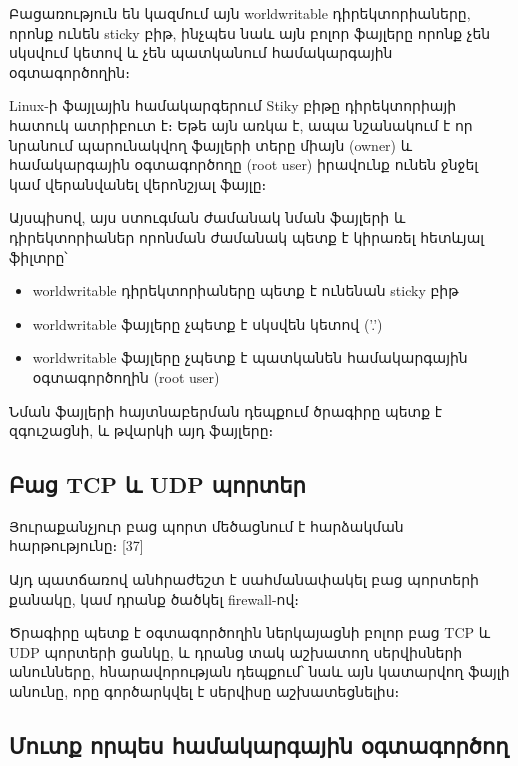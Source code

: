 \documentclass[12pt]{article}
\begin{document}
\begin{sloppypar}
Բացառություն են կազմում այն worldwritable դիրեկտորիաները, որոնք ունեն
sticky բիթ, ինչպես նաև այն բոլոր ֆայլերը որոնք չեն սկսվում կետով և չեն
պատկանում համակարգային օգտագործողին։

Linux-ի ֆայլային համակարգերում Stiky բիթը դիրեկտորիայի հատուկ ատրիբուտ է։
Եթե այն առկա է, ապա նշանակում է որ նրանում պարունակվող ֆայլերի տերը միայն (owner)
և համակարգային օգտագործողը (root user) իրավունք ունեն ջնջել կամ վերանվանել
վերոնշյալ ֆայլը։

Այսպիսով, այս ստուգման ժամանակ նման ֆայլերի և դիրեկտորիաներ որոնման ժամանակ
պետք է կիրառել հետևյալ ֆիլտրը՝

\begin{itemize}
\item worldwritable դիրեկտորիաները պետք է ունենան sticky բիթ
\item worldwritable ֆայլերը չպետք է սկսվեն կետով ('.')
\item worldwritable ֆայլերը չպետք է պատկանեն համակարգային օգտագործողին
	(root user)
\end{itemize}

Նման ֆայլերի հայտնաբերման դեպքում ծրագիրը պետք է զգուշացնի,
և թվարկի այդ ֆայլերը։


\subsection{Բաց TCP և UDP պորտեր}


Յուրաքանչյուր բաց պորտ մեծացնում է հարձակման հարթությունը։ [37]

Այդ պատճառով անհրաժեշտ է սահմանափակել բաց պորտերի քանակը,
կամ դրանք ծածկել firewall-ով։

Ծրագիրը պետք է օգտագործողին ներկայացնի բոլոր բաց 
TCP և UDP պորտերի ցանկը, և դրանց տակ աշխատող սերվիսների
անունները, հնարավորության դեպքում՝ նաև այն կատարվող
ֆայլի անունը, որը գործարկվել է սերվիսը աշխատեցնելիս։


\subsection{Մուտք որպես համակարգային օգտագործող}



\end{sloppypar}
\end{document}
